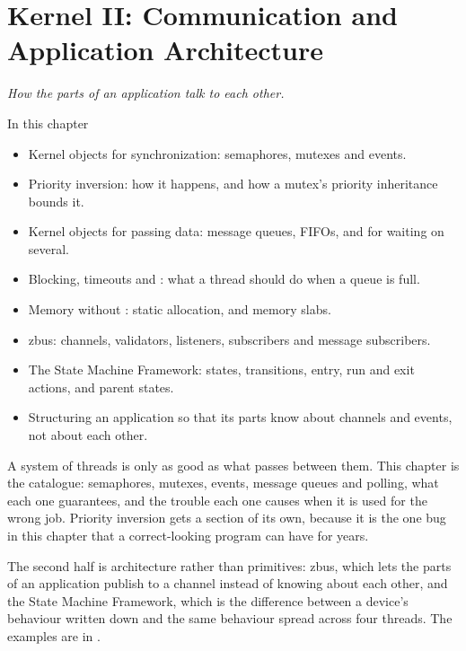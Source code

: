 
\chapter{Kernel II: Communication and Application Architecture}
\label{c4:ch:ipc}\label{c4:ch}

{\large\itshape How the parts of an application talk to each other.\par}

\begin{chapterbox}{In this chapter}
\begin{itemize}
  \item Kernel objects for synchronization: semaphores, mutexes and events.
  \item Priority inversion: how it happens, and how a mutex’s priority inheritance bounds it.
  \item Kernel objects for passing data: message queues, FIFOs, and  for waiting on several.
  \item Blocking, timeouts and : what a thread should do when a queue is full.
  \item Memory without : static allocation,  and memory slabs.
  \item zbus: channels, validators, listeners, subscribers and message subscribers.
  \item The State Machine Framework: states, transitions, entry, run and exit actions, and parent states.
  \item Structuring an application so that its parts know about channels and events, not about each other.
\end{itemize}
\end{chapterbox}

A system of threads is only as good as what passes between them. This chapter is the catalogue:
semaphores, mutexes, events, message queues and polling, what each one guarantees, and the trouble
each one causes when it is used for the wrong job. Priority inversion gets a section of its own,
because it is the one bug in this chapter that a correct-looking program can have for years.

The second half is architecture rather than primitives: zbus, which lets the parts of an application
publish to a channel instead of knowing about each other, and the State Machine Framework, which is
the difference between a device's behaviour written down and the same behaviour spread across four
threads. The examples are in .





